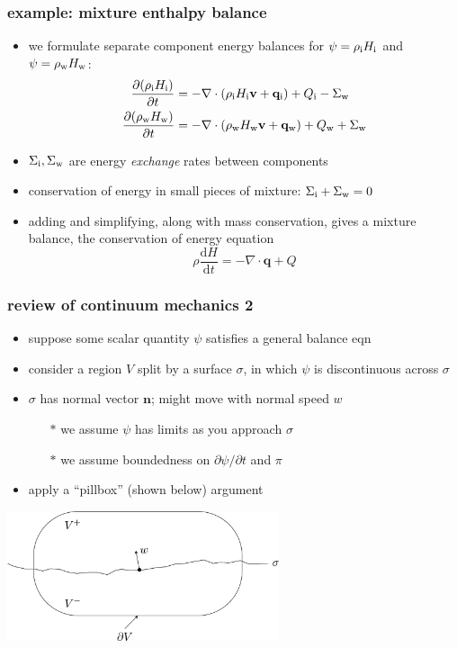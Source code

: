 \documentclass{beamer}
\newcommand{\bv}{\mathbf{v}}
\begin{document}
\begin{frame}
  \frametitle{example: mixture enthalpy balance}

\begin{itemize}
\item we formulate separate component energy balances for $\psi=\rho_{\text i} H_{\text i}$ and $\psi = \rho_{\text w} H_{\text w}$:
\scriptsize
\begin{align*}
  \frac{\partial (\rho_{\text i} H_{\text i})}{\partial t} &= - \nabla \cdot \left(\rho_{\text i} H_{\text i} \bv + \mathbf{q}_{\text i}\right) + Q_{\text i} - \Sigma_{\text w} \\
  \frac{\partial (\rho_{\text w} H_{\text w})}{\partial t} &= - \nabla \cdot \left(\rho_{\text w} H_{\text w} \bv + \mathbf{q}_{\text w}\right) + Q_{\text w} + \Sigma_{\text w}
\end{align*}
\normalsize
\item $\Sigma_{\text i},\Sigma_{\text w}$ are energy \emph{exchange} rates between components
\item conservation of energy in small pieces of mixture: $\Sigma_{\text i}+\Sigma_{\text w}=0$
\item adding and simplifying, along with mass conservation, gives a mixture balance, the \alert{conservation of energy equation}
    $$\rho \frac{\text{d} H}{\text{d}t}  = - \nabla \cdot \mathbf{q} + Q$$
\end{itemize}
\end{frame}


\begin{frame}
  \frametitle{review of continuum mechanics 2}

\begin{itemize}
\item suppose some scalar quantity $\psi$ satisfies a general balance eqn
\item consider a region $V$ split by a surface $\sigma$, in which $\psi$ is discontinuous across $\sigma$
\item $\sigma$ has normal vector $\mathbf{n}$; might move with normal speed $w$
  \begin{itemize}
  \item[$\ast$] we assume $\psi$ has limits as you approach $\sigma$
  \item[$\ast$] we assume boundedness on $\partial\psi/\partial t$ and $\pi$
  \end{itemize}
\item apply a ``pillbox'' (shown below) argument
\end{itemize}

  \begin{center}
    \includegraphics[width=0.6\textwidth]{simplepillbox}
  \end{center}
\end{frame}
\end{document}
